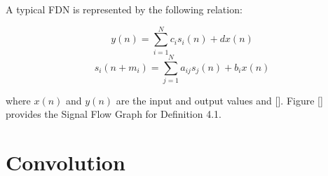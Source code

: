 A typical FDN is represented by the following relation:

\begin{defn}\label{def2}
	\begin{equation}\label{nextdef(t)}
	y(n)=\sum_{i=1}^{N} c_i s_i (n) + d x (n)
	\end{equation}
	\begin{equation}
	s_i(n + m_i)=\sum_{j=1}^{N} a_{ij} s_j (n) + b_i x (n)
\end{equation}\end{defn}

where $x(n)$ and $y(n)$ are the input and output values and []. Figure [] provides the Signal Flow Graph for Definition 4.1.

\section{Convolution}
